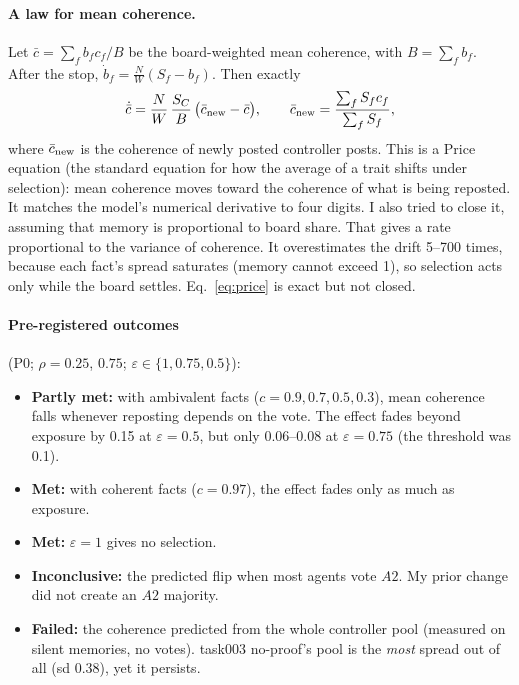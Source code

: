 \documentclass[10pt,a4paper]{article}
\begin{document}
\paragraph{A law for mean coherence.} Let $\bar c=\sum_f b_f c_f/B$ be the board-weighted mean coherence, with
$B=\sum_f b_f$. After the stop, $\dot b_f=\frac NW(S_f-b_f)$. Then exactly
\begin{equation}
\dot{\bar c}=\frac NW\,\frac{S_C}{B}\,\big(\bar c_{\rm new}-\bar c\big),\qquad
\bar c_{\rm new}=\frac{\sum_f S_f c_f}{\sum_f S_f},\label{eq:price}
\end{equation}
where $\bar c_{\rm new}$ is the coherence of newly posted controller posts. This is a Price equation (the standard
equation for how the average of a trait shifts under selection): mean coherence moves toward the coherence of what is
being reposted. It matches the model's numerical derivative to four digits. I also tried to close it, assuming that
memory is proportional to board share. That gives a rate proportional to the variance of coherence. It overestimates
the drift 5--700 times, because each fact's spread saturates (memory cannot exceed 1), so selection acts only while the
board settles. Eq.~\eqref{eq:price} is exact but not closed.

\paragraph{Pre-registered outcomes} (P0; $\rho=0.25$, $0.75$; $\varepsilon\in\{1,0.75,0.5\}$):
\begin{itemize}
\item \textbf{Partly met:} with ambivalent facts ($c=0.9,0.7,0.5,0.3$), mean coherence falls whenever reposting
  depends on the vote. The effect fades beyond exposure by 0.15 at $\varepsilon=0.5$, but only 0.06--0.08 at
  $\varepsilon=0.75$ (the threshold was 0.1).
\item \textbf{Met:} with coherent facts ($c=0.97$), the effect fades only as much as exposure.
\item \textbf{Met:} $\varepsilon=1$ gives no selection.
\item \textbf{Inconclusive:} the predicted flip when most agents vote $A2$. My prior change did not create an $A2$
  majority.
\item \textbf{Failed:} the coherence predicted from the whole controller pool (measured on silent memories, no votes).
  task003 no-proof's pool is the \emph{most} spread out of all (sd 0.38), yet it persists.
\end{itemize}
\end{document}
